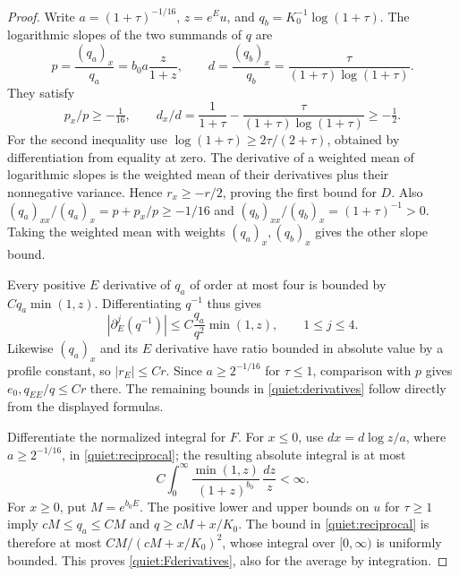 \begin{proof}
Write \(a=(1+\tau)^{-1/16}\), \(z=e^Eu\), and
\(q_b=K_0^{-1}\log(1+\tau)\).  The logarithmic slopes of the two
summands of \(q\) are
\[
 p=\frac{(q_a)_x}{q_a}=b_0a\frac z{1+z},\qquad
 d=\frac{(q_b)_x}{q_b}
     =\frac{\tau}{(1+\tau)\log(1+\tau)}.
\]
They satisfy
\[
 p_x/p\ge-\tfrac1{16},\qquad
 d_x/d=\frac1{1+\tau}
       -\frac{\tau}{(1+\tau)\log(1+\tau)}\ge-\tfrac12.
\]
For the second inequality use
\(\log(1+\tau)\ge2\tau/(2+\tau)\), obtained by differentiation from
equality at zero.  The derivative of a weighted mean of logarithmic
slopes is the weighted mean of their derivatives plus their nonnegative
variance.  Hence \(r_x\ge-r/2\), proving the first bound for \(D\).
Also
\((q_a)_{xx}/(q_a)_x=p+p_x/p\ge-1/16\) and
\((q_b)_{xx}/(q_b)_x=(1+\tau)^{-1}>0\).  Taking the weighted mean with
weights \((q_a)_x,(q_b)_x\) gives the other slope bound.

Every positive \(E\) derivative of \(q_a\) of order at most four is bounded
by \(Cq_a\min(1,z)\).  Differentiating \(q^{-1}\) thus gives
\begin{equation}\label{quiet:reciprocal}
 |\partial_E^j(q^{-1})|
       \le C\frac{q_a}{q^2}\min(1,z),\qquad 1\le j\le4.
\end{equation}
Likewise \((q_a)_x\) and its \(E\) derivative have ratio bounded in
absolute value by a profile constant, so \(|r_E|\le Cr\).
Since \(a\ge2^{-1/16}\) for \(\tau\le1\), comparison with \(p\) gives
\(e_0,q_{EE}/q\le Cr\) there.  The remaining bounds in
\eqref{quiet:derivatives} follow directly from the displayed formulas.

Differentiate the normalized integral for \(F\).  For \(x\le0\), use
\(d x=d\log z/a\), where \(a\ge2^{-1/16}\), in
\eqref{quiet:reciprocal}; the resulting absolute integral is at most
\[
 C\int_0^\infty\frac{\min(1,z)}{(1+z)^{b_0}}\,\frac{dz}{z}<\infty.
\]
For \(x\ge0\), put \(M=e^{b_0E}\).  The positive lower and upper
bounds on \(u\) for \(\tau\ge1\) imply
\(cM\le q_a\le CM\) and
\(q\ge cM+x/K_0\).  The bound in \eqref{quiet:reciprocal} is therefore
at most \(CM/(cM+x/K_0)^2\), whose integral over \([0,\infty)\)
is uniformly bounded.  This proves \eqref{quiet:Fderivatives}, also
for the average by integration.


\end{proof}
